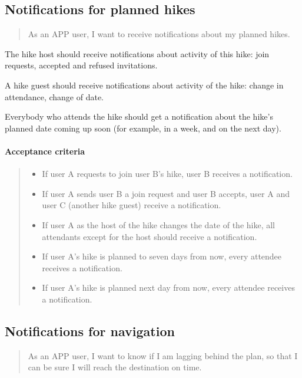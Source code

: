 \subsection{Notifications for planned hikes}\label{US:notif-plans}
\begin{quote}
As an APP user, I want to receive notifications about my planned hikes.
\end{quote}

The hike host should receive notifications about activity of this hike: join requests, accepted and refused invitations.

A hike guest should receive notifications about activity of the hike: change in attendance, change of date.

Everybody who attends the hike should get a notification about the hike's planned date coming up soon (for example, in a week, and on the next day).

\paragraph*{Acceptance criteria}
\begin{quote}
\begin{itemize}
    \item If user A requests to join user B's hike, user B receives a notification.
    \item If user A sends user B a join request and user B accepts, user A and user C (another hike guest) receive a notification.
    \item If user A as the host of the hike changes the date of the hike, all attendants except for the host should receive a notification.
    \item If user A's hike is planned to seven days from now, every attendee receives a notification.
    \item If user A's hike is planned next day from now, every attendee receives a notification.
\end{itemize}
\end{quote}

\subsection{Notifications for navigation}\label{US:notif-navig}
\begin{quote}
As an APP user, I want to know if I am lagging behind the plan, so that I can be sure I will reach the destination on time.
\end{quote}

